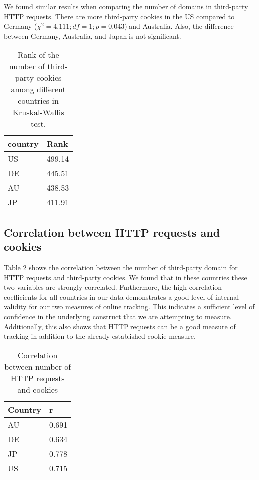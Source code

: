 \documentclass[conference]{IEEEtran}
\newcommand{\todo}[1]{}
\renewcommand{\todo}[1]{{\color{red} TODO: {#1}}}
\begin{document}
We found similar results when comparing the number of domains in third-party HTTP requests. There are more third-party cookies in the US compared to Germany ($\chi^{2} = 4.111; df=1; p=0.043$) and Australia. Also, the difference between Germany, Australia, and Japan is not significant.

\begin{table}[t]
\centering
\caption{Rank of the number of third-party cookies among different countries in Kruskal-Wallis test.}
\label{thirdcookie}
\begin{tabular}{|l|l|}
\hline
\textbf{country} & \textbf{Rank} \\ \hline
US               & 499.14        \\ \hline
DE               & 445.51        \\ \hline
AU               & 438.53        \\ \hline
JP               & 411.91        \\ \hline
\end{tabular}
\end{table}


\subsection{Correlation between HTTP requests and cookies}
Table \ref{correlation} shows the correlation between the number of third-party domain for HTTP requests and third-party cookies. We found that in these countries these two variables are strongly correlated. Furthermore, the high correlation coefficients for all countries in our data demonstrates a good level of internal validity for our two measures of online tracking. This indicates a sufficient level of confidence in the underlying construct that we are attempting to measure. Additionally, this also shows that HTTP requests can be a good measure of tracking in addition to the already established cookie measure.
 
\begin{table}[t]
\centering
\caption{Correlation between number of HTTP requests and cookies}
\label{correlation}
\begin{tabular}{|l|l|}
\hline
\textbf{Country} & \textbf{r} \\ \hline
AU               & 0.691      \\ \hline
DE               & 0.634      \\ \hline
JP               & 0.778      \\ \hline
US               & 0.715   \\  \hline
\end{tabular}
\end{table}
\end{document}
